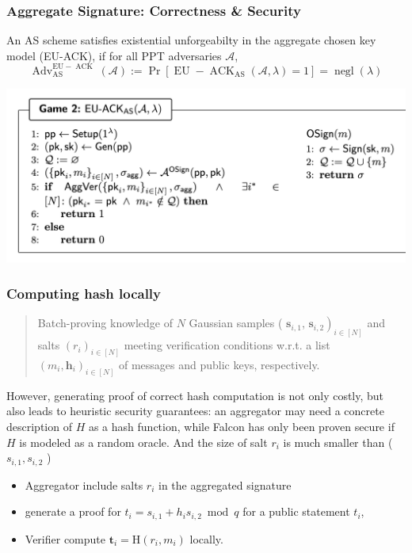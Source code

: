 \documentclass{beamer}
\begin{document}
\begin{frame}
	\frametitle{Aggregate Signature: Correctness \& Security}
	
	\begin{definition}[Unforgeability]
	
		An AS scheme satisfies existential unforgeabilty in the aggregate chosen key model (EU-ACK), if for all PPT adversaries $\mathcal{A}$,
		$$
\operatorname{Adv}_{\mathrm{AS}}^{\mathrm{EU}-\operatorname{ACK}}(\mathcal{A}):= 
\operatorname{Pr}\left[{\left.\operatorname{EU}-\operatorname{ACK}_{\mathrm{AS}}(\mathcal{A}, \lambda)=1\right]=\operatorname{negl}(\lambda)}\right.
$$
	
	\end{definition}
\includegraphics[scale=0.45]{euack.png}	
\end{frame}



\begin{frame}
\frametitle{Computing hash locally}

\begin{quote}
	Batch-proving knowledge of $N$ Gaussian samples ( $\boldsymbol{s}_{i, 1}$, $\left.\boldsymbol{s}_{i, 2}\right)_{i \in[N]}$ and salts $\left(r_i\right)_{i \in[N]}$ meeting verification conditions w.r.t. a list $\left(m_i, \boldsymbol{h}_i\right)_{i \in[N]}$ of  messages and public keys, respectively. 
\end{quote} 


However, generating proof of correct hash computation is not only costly, but also leads to heuristic security guarantees: an aggregator may need a concrete description of $H$ as a hash function, while Falcon has only been proven secure if $H$ is modeled as a random oracle. And the size of salt $r_i$ is much smaller than ( $s_{i, 1}, s_{i, 2}$ )

\begin{itemize}
	\item Aggregator include salts $r_i$ in the aggregated signature 
	\item generate a proof for $t_i=s_{i, 1}+h_i s_{i, 2} \bmod q$ for a public statement $t_i$, 
	\item Verifier compute $\boldsymbol{t}_i=\mathrm{H}\left(r_i, m_i\right)$ locally. 
\end{itemize}

\end{frame}
\end{document}
